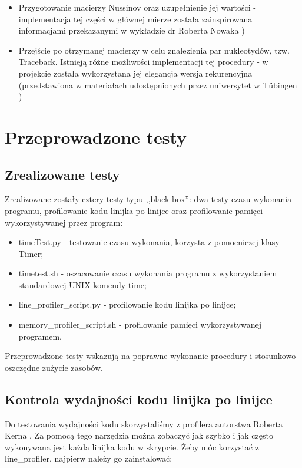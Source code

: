 \documentclass[paper=a4, fontsize=11pt]{scrartcl} %
\numberwithin{equation}{section} %
\numberwithin{figure}{section} %
\numberwithin{table}{section} %
\begin{document}
\begin{itemize}

	\item Przygotowanie macierzy Nussinov oraz uzupełnienie jej wartości - implementacja tej części w głównej mierze została zainspirowana informacjami przekazanymi w wykładzie dr Roberta Nowaka \cite{bib:slajdyNowak})
	\item Przejście po otrzymanej macierzy w celu znalezienia par nukleotydów, tzw. Traceback. Istnieją różne możliwości implementacji tej procedury - w projekcie została wykorzystana jej elegancja wersja rekurencyjna (przedstawiona w materiałach udostępnionych przez uniwersytet w Tübingen \cite{bib:slajdyTubigen})
	
\end{itemize}


\section{Przeprowadzone testy}

\subsection{Zrealizowane testy}
Zrealizowane zostały cztery testy typu ,,black box'': dwa testy czasu wykonania programu, profilowanie kodu linijka po linijce oraz profilowanie pamięci wykorzystywanej przez program:

\begin{itemize}
\item timeTest.py - testowanie czasu wykonania, korzysta z pomocniczej klasy Timer;
\item timetest.sh - oszacowanie czasu wykonania programu z wykorzystaniem standardowej UNIX komendy time;
\item line\_profiler\_script.py - profilowanie kodu linijka po linijce;
\item memory\_profiler\_script.sh - profilowanie pamięci wykorzystywanej programem.



\end{itemize}


Przeprowadzone testy wskazują na poprawne wykonanie procedury i stosunkowo oszczędne zużycie zasobów.

\subsection{Kontrola wydajności kodu linijka po linijce}
Do testowania wydajności kodu skorzystaliśmy z profilera autorstwa Roberta Kerna \cite{bib:Kern}. Za pomocą tego narzędzia można zobaczyć jak szybko i jak często wykonywana jest każda linijka kodu w skrypcie. Żeby móc korzystać z line\_profiler, najpierw należy go zainstalować:
 
\end{document}
